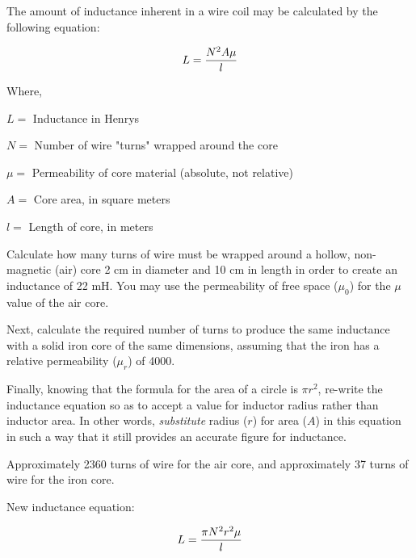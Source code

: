 

The amount of inductance inherent in a wire coil may be calculated by the following equation:

$$L = {{N^2 A \mu} \over l}$$

\noindent
Where,

$L =$ Inductance in Henrys

$N =$ Number of wire "turns" wrapped around the core

$\mu =$ Permeability of core material (absolute, not relative)

$A =$ Core area, in square meters

$l =$ Length of core, in meters

\vskip 10pt

Calculate how many turns of wire must be wrapped around a hollow, non-magnetic (air) core 2 cm in diameter and 10 cm in length in order to create an inductance of 22 mH.  You may use the permeability of free space ($\mu_0$) for the $\mu$ value of the air core.

Next, calculate the required number of turns to produce the same inductance with a solid iron core of the same dimensions, assuming that the iron has a relative permeability ($\mu_r$) of 4000.

\vskip 10pt

Finally, knowing that the formula for the area of a circle is $\pi r^2$, re-write the inductance equation so as to accept a value for inductor radius rather than inductor area.  In other words, {\it substitute} radius ($r$) for area ($A$) in this equation in such a way that it still provides an accurate figure for inductance.







Approximately 2360 turns of wire for the air core, and approximately 37 turns of wire for the iron core.

\vskip 10pt

New inductance equation:

$$L = {{\pi N^2 r^2 \mu} \over l}$$






